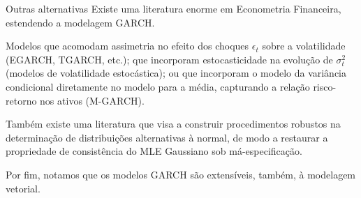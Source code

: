 \documentclass[11pt]{beamer}
\newenvironment{halfwideitemize}{\itemize\addtolength{\itemsep}{0.5em}}{\enditemize}
\begin{document}
\begin{frame}{Outras alternativas}
Existe uma literatura enorme em Econometria Financeira, estendendo a modelagem GARCH.
		\begin{halfwideitemize}
			\item Modelos que acomodam assimetria no efeito dos choques $\epsilon_t$ sobre a volatilidade (EGARCH, TGARCH, etc.); que incorporam estocasticidade na evolução de $\sigma^2_t$ (modelos de volatilidade estocástica);  ou que incorporam o modelo da variância condicional diretamente no modelo para a média, capturando a relação risco-retorno nos ativos (M-GARCH).
			\item Também existe uma literatura que visa a construir procedimentos robustos na determinação de distribuições alternativas à normal, de modo a restaurar a propriedade de consistência do MLE Gaussiano sob má-especificação.
			\item Por fim, notamos que os modelos GARCH são extensíveis, também, à modelagem vetorial.
	\end{halfwideitemize}
\end{frame}
\end{document}
